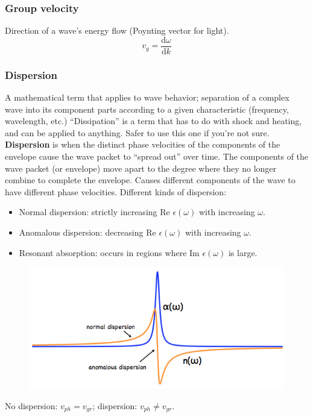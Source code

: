 \documentclass{article}
\begin{document}
\subsubsection{Group velocity}
Direction of a wave's energy flow (Poynting vector for light).
\[
    v_{g} = \frac{ \mathrm{d}\omega }{ \mathrm{d}k }
    \]

\subsubsection{Dispersion}
A mathematical term that applies to wave behavior; separation of a complex
wave into its component parts according to a given characteristic
(frequency, wavelength, etc.) ``Dissipation'' is a term that has to do with
shock and heating, and can be applied to anything. Safer to use this one
if you're not sure.
\textbf{Dispersion} is when the distinct phase velocities of the components of the
envelope cause the wave packet to ``spread out'' over time.
The components of the wave packet (or envelope) move apart to the degree
where they no longer combine to complete the envelope.
Causes different components of the wave to have different phase velocities.
Different kinds of dispersion:
\begin{itemize}
    \item Normal dispersion: strictly increasing Re ${\epsilon(\omega)}$ with
        increasing ${\omega}$.
    \item Anomalous dispersion: decreasing Re ${\epsilon(\omega)}$ with
        increasing ${\omega}$.
    \item Resonant absorption: occurs in regions where Im ${\epsilon(\omega)}$
        is large.
\end{itemize}
\begin{figure}[h]
    \centering
    \includegraphics[width=5in]{disp.png}
\end{figure}
No dispersion: ${v_{ph} = v_{gr}}$; dispersion: ${v_{ph} \neq v_{gr}}$.
\end{document}
